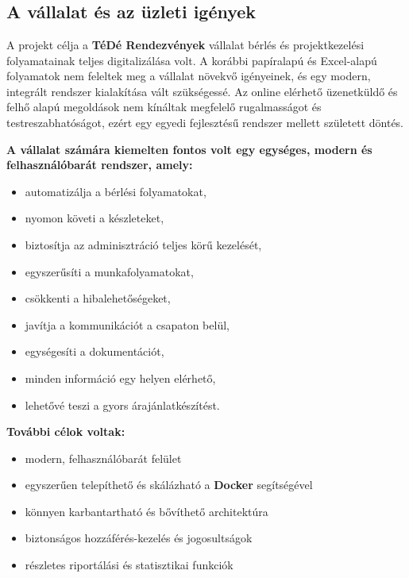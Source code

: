 \chapter{\projectoverview}
\section{A vállalat és az üzleti igények}

A projekt célja a \textbf{TéDé Rendezvények} vállalat bérlés és projektkezelési folyamatainak teljes digitalizálása volt. 
A korábbi papíralapú és Excel-alapú folyamatok nem feleltek meg a vállalat növekvő igényeinek,
és egy modern, integrált rendszer kialakítása vált szükségessé. Az online elérhető üzenetküldő és felhő alapú megoldások
nem kínáltak megfelelő rugalmasságot és testreszabhatóságot, ezért egy egyedi fejlesztésű rendszer mellett született döntés.

\textbf{A vállalat számára kiemelten fontos volt egy egységes, modern és felhasználóbarát rendszer, amely:}
\begin{itemize}
    \item automatizálja a bérlési folyamatokat,
    \item nyomon követi a készleteket,
    \item biztosítja az adminisztráció teljes körű kezelését,
    \item egyszerűsíti a munkafolyamatokat,
    \item csökkenti a hibalehetőségeket,
    \item javítja a kommunikációt a csapaton belül,
    \item egységesíti a dokumentációt,
    \item minden információ egy helyen elérhető,
    \item lehetővé teszi a gyors árajánlatkészítést.
\end{itemize}

\pagebreak
\textbf{További célok voltak:}
\begin{itemize}
    \item modern, felhasználóbarát felület
    \item egyszerűen telepíthető és skálázható a \textbf{Docker} segítségével
    \item könnyen karbantartható és bővíthető architektúra
    \item biztonságos hozzáférés-kezelés és jogosultságok
    \item részletes riportálási és statisztikai funkciók
\end{itemize}

